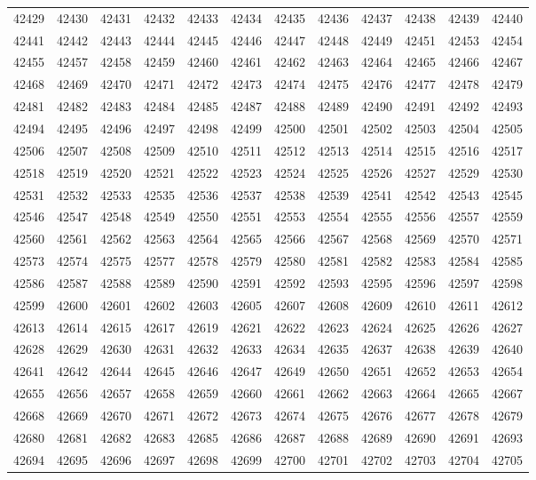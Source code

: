\begin{center}
\begin{longtable}{llllllllllll}
42429 &42430 &42431 &42432 &42433 &42434 &42435 &42436 &42437 &42438 &42439 &42440 \\
42441 &42442 &42443 &42444 &42445 &42446 &42447 &42448 &42449 &42451 &42453 &42454 \\
42455 &42457 &42458 &42459 &42460 &42461 &42462 &42463 &42464 &42465 &42466 &42467 \\
42468 &42469 &42470 &42471 &42472 &42473 &42474 &42475 &42476 &42477 &42478 &42479 \\
42481 &42482 &42483 &42484 &42485 &42487 &42488 &42489 &42490 &42491 &42492 &42493 \\
42494 &42495 &42496 &42497 &42498 &42499 &42500 &42501 &42502 &42503 &42504 &42505 \\
42506 &42507 &42508 &42509 &42510 &42511 &42512 &42513 &42514 &42515 &42516 &42517 \\
42518 &42519 &42520 &42521 &42522 &42523 &42524 &42525 &42526 &42527 &42529 &42530 \\
42531 &42532 &42533 &42535 &42536 &42537 &42538 &42539 &42541 &42542 &42543 &42545 \\
42546 &42547 &42548 &42549 &42550 &42551 &42553 &42554 &42555 &42556 &42557 &42559 \\
42560 &42561 &42562 &42563 &42564 &42565 &42566 &42567 &42568 &42569 &42570 &42571 \\
42573 &42574 &42575 &42577 &42578 &42579 &42580 &42581 &42582 &42583 &42584 &42585 \\
42586 &42587 &42588 &42589 &42590 &42591 &42592 &42593 &42595 &42596 &42597 &42598 \\
42599 &42600 &42601 &42602 &42603 &42605 &42607 &42608 &42609 &42610 &42611 &42612 \\
42613 &42614 &42615 &42617 &42619 &42621 &42622 &42623 &42624 &42625 &42626 &42627 \\
42628 &42629 &42630 &42631 &42632 &42633 &42634 &42635 &42637 &42638 &42639 &42640 \\
42641 &42642 &42644 &42645 &42646 &42647 &42649 &42650 &42651 &42652 &42653 &42654 \\
42655 &42656 &42657 &42658 &42659 &42660 &42661 &42662 &42663 &42664 &42665 &42667 \\
42668 &42669 &42670 &42671 &42672 &42673 &42674 &42675 &42676 &42677 &42678 &42679 \\
42680 &42681 &42682 &42683 &42685 &42686 &42687 &42688 &42689 &42690 &42691 &42693 \\
42694 &42695 &42696 &42697 &42698 &42699 &42700 &42701 &42702 &42703 &42704 &42705 \\

\end{longtable}
\end{center}
